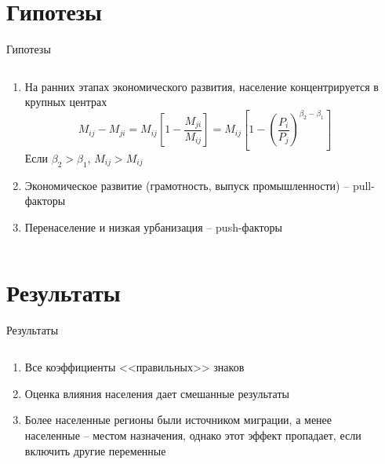 \documentclass[aspectratio=169]{beamer}
\begin{document}
\section{Гипотезы}
\begin{frame}{Гипотезы}

\begin{columns}
	\begin{column}{0.60\textwidth}
		\begin{enumerate}
			\item На ранних этапах экономического развития, население концентрируется в крупных центрах
			\begin{equation*}
                    M_{ij} - M_{ji} = M_{ij} \left[ 1 - \frac{M_{ji}}{M_{ij}} \right] = M_{ij} \left[ 1 - \left( \frac{P_i}{P_j} \right)^{\beta_2 - \beta_1} \right]
			\end{equation*}
			Если $\beta_2>\beta_1$, $M_{ij}>M_{ij}$ \citep{poot_gravity_2016}
			\item Экономическое развитие (грамотность, выпуск промышленности) -- pull-факторы
			\item Перенаселение и низкая урбанизация -- push-факторы
		\end{enumerate}
	\end{column}
	
	\begin{column}{0.34\textwidth}
		
	\end{column}
\end{columns}

\end{frame}

\section{Результаты}
\begin{frame}{Результаты}
	
\begin{columns}
	\begin{column}{0.58\textwidth}
		\begin{enumerate}
			\item Все коэффициенты <<правильных>> знаков
			\item Оценка влияния населения дает смешанные результаты
			\item Более населенные регионы были источником миграции, а менее населенные -- местом назначения, однако этот эффект пропадает, если включить другие переменные
		\end{enumerate}
	\end{column}
		
	\begin{column}{0.42\textwidth}
		\begin{tiny}
			
		\end{tiny}
	\end{column}
\end{columns}
    
\end{frame}
\end{document}
